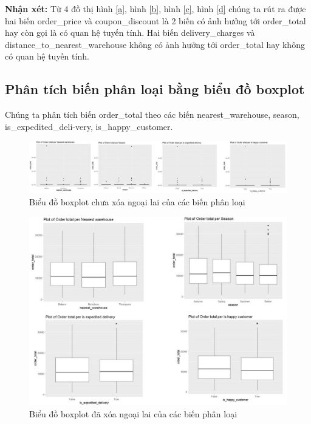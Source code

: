 \textbf{Nhận xét:} Từ 4 đồ thị hình \ref{a}, hình \ref{b}, hình \ref{c}, hình \ref{d} chúng ta rút ra được hai biến order\_price và coupon\_discount là 2 biến có ảnh hưởng tới order\_total hay còn gọi là có quan hệ tuyến tính. Hai biến delivery\_charges và distance\_to\_nearest\_warehouse không có ảnh hưởng tới order\_total hay không có quan hệ tuyến tính.

\subsection{Phân tích biến phân loại bằng biểu đồ boxplot}
Chúng ta phân tích biến order\_total theo các biến nearest\_warehouse, season, is\_expedited\_deli-very, is\_happy\_customer.
\begin{figure}[!htbp]
    \centering
    \includegraphics[width=1\linewidth]{graphics/bang13.jpg}
    \caption{Biểu đồ boxplot chưa xóa ngoại lai của các biến phân loại}
\end{figure}
\begin{figure}[!htbp]
    \centering
 \includegraphics[width=0.9\linewidth]{graphics/bang14.jpg}
 \caption{Biểu đồ boxplot đã xóa ngoại lai của các biến phân loại}
 \label{e}
\end{figure}


